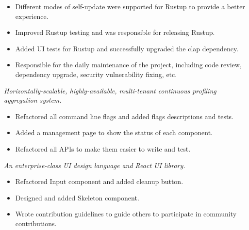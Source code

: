 \documentclass{resume}
\newcommand{\en}[1]{#1}
\newcommand{\zh}[1]{}
\begin{document}
\begin{itemize}
      \item \en{Different modes of self-update were supported for Rustup to provide a better experience.}
            \zh{为 Rustup 支持了 self-update 的不同模式来提供更好的使用体验。}
      \item \en{Improved Rustup testing and was responsible for releasing Rustup.}
            \zh{改善 Rustup 测试，负责发布 Rustup。}
      \item \en{Added UI tests for Rustup and successfully upgraded the clap dependency.}
            \zh{为 Rustup 添加了 UI 测试，顺利升级了 clap 依赖。}
      \item \en{Responsible for the daily maintenance of the project, including code review, dependency upgrade, security vulnerability fixing, etc.}
            \zh{负责项目日常维护，包括代码审查、依赖升级、安全漏洞修复等。}
\end{itemize}

\en{}
\zh{\datedsubsection{\textbf{Phlare - 活跃贡献者}}{{\href{https://github.com/grafana/phlare/commits?author=hi-rustin}{28+ commits}}}}
\en{\textsl{Horizontally-scalable, highly-available, multi-tenant continuous profiling aggregation system.}}
\zh{\textsl{水平扩展、高可用、多租户的持续性能分析聚合系统。}}

\begin{itemize}
      \item \en{Refactored all command line flags and added flags descriptions and tests.}
            \zh{重构了所有命令行参数，并添加了参数说明和测试。}
      \item \en{Added a management page to show the status of each component.}
            \zh{添加了管理页面展示各组件状态。}
      \item \en{Refactored all APIs to make them easier to write and test.}
            \zh{重构了所有 API 使其更容易编写和测试。}
\end{itemize}

\en{}
\zh{\datedsubsection{\textbf{ant-design - 前维护者}}{{\href{https://github.com/ant-design/ant-design/commits?author=hi-rustin}{24+ commits}}}}
\en{\textsl{An enterprise-class UI design language and React UI library.}}
\zh{\textsl{企业级 UI 设计语言和 React UI 库。}}

\begin{itemize}
      \item \en{Refactored Input component and added cleanup button.}
            \zh{重构了 Input 组件，添加清理按钮。}
      \item \en{Designed and added Skeleton component.}
            \zh{设计并添加了 Skeleton 组件。}
      \item \en{Wrote contribution guidelines to guide others to participate in community contributions.}
            \zh{编写了贡献指南，引导其他人参与社区贡献。}
\end{itemize}
\end{document}
